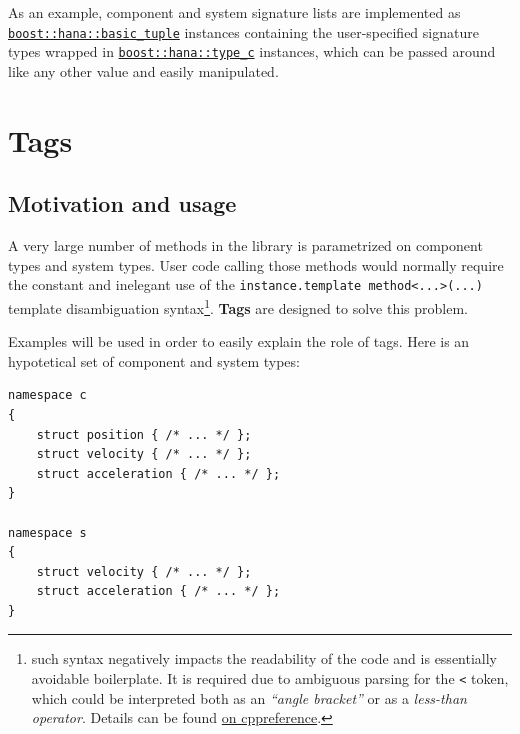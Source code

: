 \documentclass[twoside, 12pt, a4paper, openany]{book}
\begin{document}
As an example, component and system signature lists are implemented as
\href{http://www.boost.org/doc/libs/1_61_0/libs/hana/doc/html/structboost_1_1hana_1_1basic__tuple.html}{\texttt{boost::hana::basic_tuple}}
instances containing the user-specified signature types wrapped in
\href{http://www.boost.org/doc/libs/1_61_0/libs/hana/doc/html/structboost_1_1hana_1_1type.html\#ae35139e732c4b75e91061513cf445628}{\texttt{boost::hana::type_c}}
instances, which can be passed around like any other value and easily
manipulated.

\hypertarget{metaprogramming_tags}{\section{Tags}\label{metaprogramming_tags}}

\subsection{Motivation and usage}\label{motivation-and-usage}

A very large number of methods in the library is parametrized on
component types and system types. User code calling those methods would
normally require the constant and inelegant use of the
\texttt{instance.template method<...>(...)}
template disambiguation syntax\footnote{such syntax negatively impacts
  the readability of the code and is essentially avoidable boilerplate.
  It is required due to ambiguous parsing for the
  \texttt{<}
  token, which could be interpreted both as an \emph{``angle bracket''}
  or as a \emph{less-than operator}. Details can be found
  \href{http://en.cppreference.com/w/cpp/language/dependent_name\#The_template_disambiguator_for_dependent_names}{on
  cppreference}.}. \textbf{Tags} are designed to solve this problem.

Examples will be used in order to easily explain the role of tags. Here
is an hypotetical set of component and system types:

\begin{verbatim}
namespace c
{
    struct position { /* ... */ };
    struct velocity { /* ... */ };
    struct acceleration { /* ... */ };
}

namespace s
{
    struct velocity { /* ... */ };
    struct acceleration { /* ... */ };
}
\end{verbatim}
\end{document}
